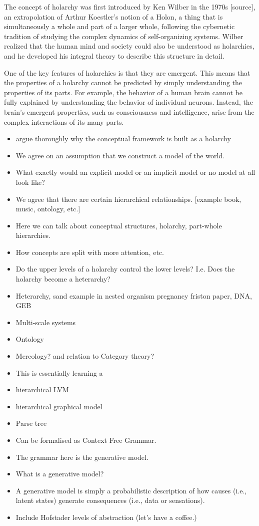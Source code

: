 The concept of holarchy was first introduced by Ken Wilber in the 1970s [source], an extrapolation of Arthur Koestler's notion of a Holon, a thing that is simultaneously a whole and part of a larger whole, following the cybernetic tradition of studying the complex dynamics of self-organizing systems. Wilber realized that the human mind and society could also be understood as holarchies, and he developed his integral theory to describe this structure in detail.

One of the key features of holarchies is that they are emergent. This means that the properties of a holarchy cannot be predicted by simply understanding the properties of its parts. For example, the behavior of a human brain cannot be fully explained by understanding the behavior of individual neurons. Instead, the brain's emergent properties, such as consciousness and intelligence, arise from the complex interactions of its many parts.


\begin{itemize}
    \item argue thoroughly why the conceptual framework is built as a holarchy
    \item We agree on an assumption that we construct a model of the world.
    \item What exactly would an explicit model or an implicit model or no model at all look like?
    \item We agree that there are certain hierarchical relationships. [example book, music, ontology, etc.]
    \item Here we can talk about conceptual structures, holarchy, part-whole hierarchies. 
    \item How concepts are split with more attention, etc. 
    \item Do the upper levels of a holarchy control the lower levels? I.e. Does the holarchy become a heterarchy?
    \item Heterarchy, sand example in nested organism pregnancy friston paper, DNA, GEB
    \item Multi-scale systems
    \item Ontology
    \item Mereology? and relation to Category theory?
    \item This is essentially learning a 
        \item hierarchical LVM
        \item hierarchical graphical model
        \item Parse tree
        \item Can be formalised as Context Free Grammar. 
        \item The grammar here is the generative model. 
        \item What is a generative model?
        \item A generative model is simply a probabilistic description of how causes (i.e., latent states) generate consequences (i.e., data or sensations). \cite{friston_world_2021}
    \item Include Hofstader levels of abstraction (let's have a coffee.)
\end{itemize}

